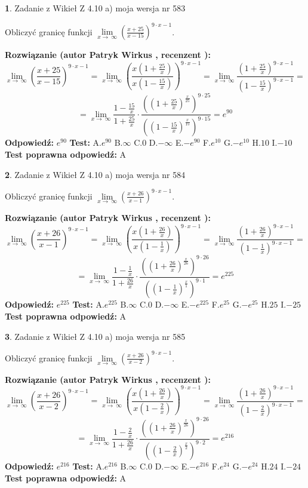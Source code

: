 \documentclass[12pt, a4paper]{article}
\theoremstyle{definition} %
\newtheorem{zad}{}
\newcommand{\zadStart}[1]{\begin{zad}#1\newline}
\newcommand{\zadStop}{\end{zad}}
\newcommand{\rozwStart}[2]{\noindent \textbf{Rozwiązanie (autor #1 , recenzent #2): }\newline}
\newcommand{\rozwStop}{\newline}
\newcommand{\odpStart}{\noindent \textbf{Odpowiedź:}\newline}
\newcommand{\odpStop}{\newline}
\newcommand{\testStart}{\noindent \textbf{Test:}\newline}
\newcommand{\testStop}{\newline}
\newcommand{\kluczStart}{\noindent \textbf{Test poprawna odpowiedź:}\newline}
\newcommand{\kluczStop}{\newline}
\begin{document}
\zadStart{Zadanie z Wikieł Z 4.10 a) moja wersja nr 583}

Obliczyć granicę funkcji  $\lim\limits_{x\to\ \infty}(\frac{x+25}{x-15})^{9\cdot x-1}$.
\zadStop
\rozwStart{Patryk Wirkus}{}
$$\lim\limits_{x\to\ \infty}(\frac{x+25}{x-15})^{9\cdot x-1} = \lim\limits_{x\to\ \infty}(\frac{x(1+\frac{25}{x})}{x(1-\frac{15}{x})})^{9\cdot x-1}=\lim\limits_{x\to\ \infty}\frac{(1+\frac{25}{x})^{9\cdot x-1}}{(1-\frac{15}{x})^{9\cdot x-1}}=$$
$$=\lim\limits_{x\to\ \infty}\frac{1-\frac{15}{x}}{1+\frac{25}{x}}\cdot\frac{((1+\frac{25}{x})^{\frac{x}{25}})^{9\cdot25}}{((1-\frac{15}{x})^{\frac{x}{15}})^{9\cdot15}}=e^{90}$$
\rozwStop
\odpStart
$e^{90}$
\odpStop
\testStart
A.$e^{90}$ B.$\infty$ C.$0$ D.$-\infty$ E.$-e^{90}$
F.$e^{10}$ G.$-e^{10}$
H.$10$
I.$-10$
\testStop
\kluczStart
A
\kluczStop



\zadStart{Zadanie z Wikieł Z 4.10 a) moja wersja nr 584}

Obliczyć granicę funkcji  $\lim\limits_{x\to\ \infty}(\frac{x+26}{x-1})^{9\cdot x-1}$.
\zadStop
\rozwStart{Patryk Wirkus}{}
$$\lim\limits_{x\to\ \infty}(\frac{x+26}{x-1})^{9\cdot x-1} = \lim\limits_{x\to\ \infty}(\frac{x(1+\frac{26}{x})}{x(1-\frac{1}{x})})^{9\cdot x-1}=\lim\limits_{x\to\ \infty}\frac{(1+\frac{26}{x})^{9\cdot x-1}}{(1-\frac{1}{x})^{9\cdot x-1}}=$$
$$=\lim\limits_{x\to\ \infty}\frac{1-\frac{1}{x}}{1+\frac{26}{x}}\cdot\frac{((1+\frac{26}{x})^{\frac{x}{26}})^{9\cdot26}}{((1-\frac{1}{x})^{\frac{x}{1}})^{9\cdot1}}=e^{225}$$
\rozwStop
\odpStart
$e^{225}$
\odpStop
\testStart
A.$e^{225}$ B.$\infty$ C.$0$ D.$-\infty$ E.$-e^{225}$
F.$e^{25}$ G.$-e^{25}$
H.$25$
I.$-25$
\testStop
\kluczStart
A
\kluczStop



\zadStart{Zadanie z Wikieł Z 4.10 a) moja wersja nr 585}

Obliczyć granicę funkcji  $\lim\limits_{x\to\ \infty}(\frac{x+26}{x-2})^{9\cdot x-1}$.
\zadStop
\rozwStart{Patryk Wirkus}{}
$$\lim\limits_{x\to\ \infty}(\frac{x+26}{x-2})^{9\cdot x-1} = \lim\limits_{x\to\ \infty}(\frac{x(1+\frac{26}{x})}{x(1-\frac{2}{x})})^{9\cdot x-1}=\lim\limits_{x\to\ \infty}\frac{(1+\frac{26}{x})^{9\cdot x-1}}{(1-\frac{2}{x})^{9\cdot x-1}}=$$
$$=\lim\limits_{x\to\ \infty}\frac{1-\frac{2}{x}}{1+\frac{26}{x}}\cdot\frac{((1+\frac{26}{x})^{\frac{x}{26}})^{9\cdot26}}{((1-\frac{2}{x})^{\frac{x}{2}})^{9\cdot2}}=e^{216}$$
\rozwStop
\odpStart
$e^{216}$
\odpStop
\testStart
A.$e^{216}$ B.$\infty$ C.$0$ D.$-\infty$ E.$-e^{216}$
F.$e^{24}$ G.$-e^{24}$
H.$24$
I.$-24$
\testStop
\kluczStart
A
\kluczStop
\end{document}
